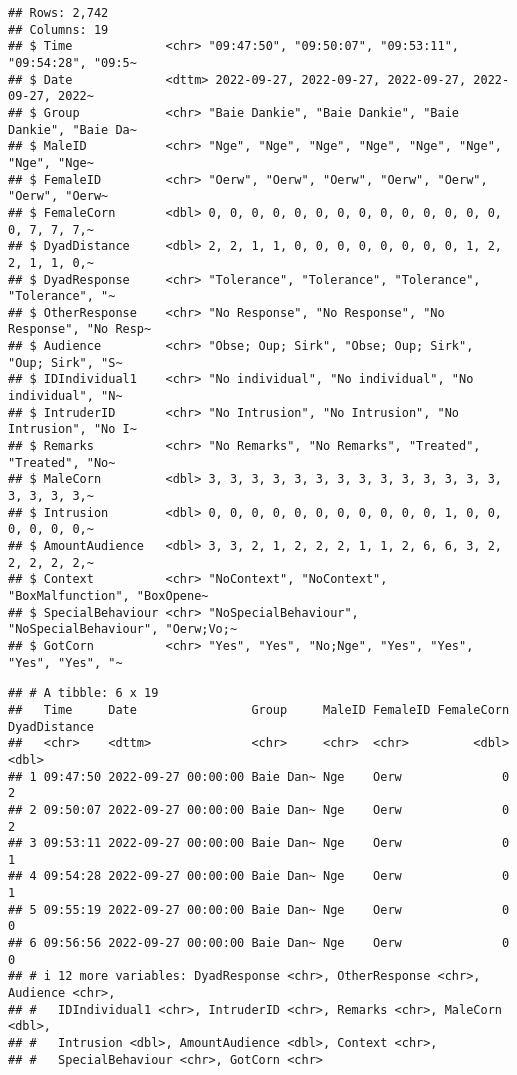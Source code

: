\documentclass[
]{article}
\begin{document}
\begin{verbatim}
## Rows: 2,742
## Columns: 19
## $ Time             <chr> "09:47:50", "09:50:07", "09:53:11", "09:54:28", "09:5~
## $ Date             <dttm> 2022-09-27, 2022-09-27, 2022-09-27, 2022-09-27, 2022~
## $ Group            <chr> "Baie Dankie", "Baie Dankie", "Baie Dankie", "Baie Da~
## $ MaleID           <chr> "Nge", "Nge", "Nge", "Nge", "Nge", "Nge", "Nge", "Nge~
## $ FemaleID         <chr> "Oerw", "Oerw", "Oerw", "Oerw", "Oerw", "Oerw", "Oerw~
## $ FemaleCorn       <dbl> 0, 0, 0, 0, 0, 0, 0, 0, 0, 0, 0, 0, 0, 0, 0, 7, 7, 7,~
## $ DyadDistance     <dbl> 2, 2, 1, 1, 0, 0, 0, 0, 0, 0, 0, 0, 1, 2, 2, 1, 1, 0,~
## $ DyadResponse     <chr> "Tolerance", "Tolerance", "Tolerance", "Tolerance", "~
## $ OtherResponse    <chr> "No Response", "No Response", "No Response", "No Resp~
## $ Audience         <chr> "Obse; Oup; Sirk", "Obse; Oup; Sirk", "Oup; Sirk", "S~
## $ IDIndividual1    <chr> "No individual", "No individual", "No individual", "N~
## $ IntruderID       <chr> "No Intrusion", "No Intrusion", "No Intrusion", "No I~
## $ Remarks          <chr> "No Remarks", "No Remarks", "Treated", "Treated", "No~
## $ MaleCorn         <dbl> 3, 3, 3, 3, 3, 3, 3, 3, 3, 3, 3, 3, 3, 3, 3, 3, 3, 3,~
## $ Intrusion        <dbl> 0, 0, 0, 0, 0, 0, 0, 0, 0, 0, 0, 1, 0, 0, 0, 0, 0, 0,~
## $ AmountAudience   <dbl> 3, 3, 2, 1, 2, 2, 2, 1, 1, 2, 6, 6, 3, 2, 2, 2, 2, 2,~
## $ Context          <chr> "NoContext", "NoContext", "BoxMalfunction", "BoxOpene~
## $ SpecialBehaviour <chr> "NoSpecialBehaviour", "NoSpecialBehaviour", "Oerw;Vo;~
## $ GotCorn          <chr> "Yes", "Yes", "No;Nge", "Yes", "Yes", "Yes", "Yes", "~
\end{verbatim}

\begin{verbatim}
## # A tibble: 6 x 19
##   Time     Date                Group     MaleID FemaleID FemaleCorn DyadDistance
##   <chr>    <dttm>              <chr>     <chr>  <chr>         <dbl>        <dbl>
## 1 09:47:50 2022-09-27 00:00:00 Baie Dan~ Nge    Oerw              0            2
## 2 09:50:07 2022-09-27 00:00:00 Baie Dan~ Nge    Oerw              0            2
## 3 09:53:11 2022-09-27 00:00:00 Baie Dan~ Nge    Oerw              0            1
## 4 09:54:28 2022-09-27 00:00:00 Baie Dan~ Nge    Oerw              0            1
## 5 09:55:19 2022-09-27 00:00:00 Baie Dan~ Nge    Oerw              0            0
## 6 09:56:56 2022-09-27 00:00:00 Baie Dan~ Nge    Oerw              0            0
## # i 12 more variables: DyadResponse <chr>, OtherResponse <chr>, Audience <chr>,
## #   IDIndividual1 <chr>, IntruderID <chr>, Remarks <chr>, MaleCorn <dbl>,
## #   Intrusion <dbl>, AmountAudience <dbl>, Context <chr>,
## #   SpecialBehaviour <chr>, GotCorn <chr>
\end{verbatim}
\end{document}
